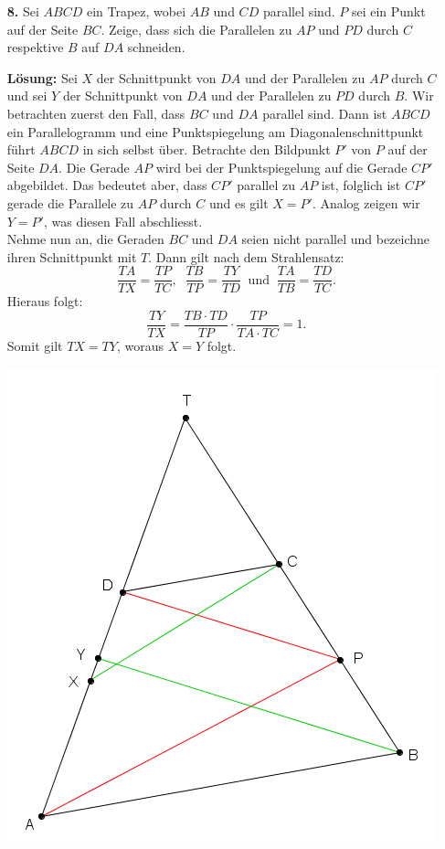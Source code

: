 \documentclass[language=german,style=solution]{smo}
\begin{document}
\begin{enumerate}
\item[\textbf{8.}] Sei $ABCD$ ein Trapez, wobei $AB$ und $CD$ parallel sind. $P$ sei ein Punkt auf der Seite $BC$. Zeige, dass sich die Parallelen zu $AP$ und $PD$ durch $C$ respektive $B$ auf $DA$ schneiden.

\textbf{Lösung:} Sei $X$ der Schnittpunkt von $DA$ und der Parallelen zu $AP$ durch $C$ und sei $Y$ der Schnittpunkt von $DA$ und der Parallelen zu $PD$ durch $B$. Wir betrachten zuerst den Fall, dass $BC$ und $DA$ parallel sind. Dann ist $ABCD$ ein Parallelogramm und eine Punktspiegelung am Diagonalenschnittpunkt führt $ABCD$ in sich selbst über. Betrachte den Bildpunkt $P'$ von $P$ auf der Seite $DA$. Die Gerade $AP$ wird bei der Punktspiegelung auf die Gerade $CP'$ abgebildet. Das bedeutet aber, dass $CP'$ parallel zu $AP$ ist, folglich ist $CP'$ gerade die Parallele zu $AP$ durch $C$ und es gilt $X=P'$. Analog zeigen wir $Y=P'$, was diesen Fall abschliesst.\\
Nehme nun an, die Geraden $BC$ und $DA$ seien nicht parallel und bezeichne ihren Schnittpunkt mit $T$. Dann gilt nach dem Strahlensatz:
\[
\frac{TA}{TX}=\frac{TP}{TC},\;\;\frac{TB}{TP}=\frac{TY}{TD}\;\;\text{und}\;\;\frac{TA}{TB}=\frac{TD}{TC}.
\]
Hieraus folgt:
\[
\frac{TY}{TX}=\frac{TB\cdot TD}{TP}\cdot\frac{TP}{TA\cdot TC}=1. 
\]
Somit gilt $TX=TY$, woraus $X=Y$ folgt.

\includegraphics{Finalrunde_8}
\newpage


\end{enumerate}
\end{document}
